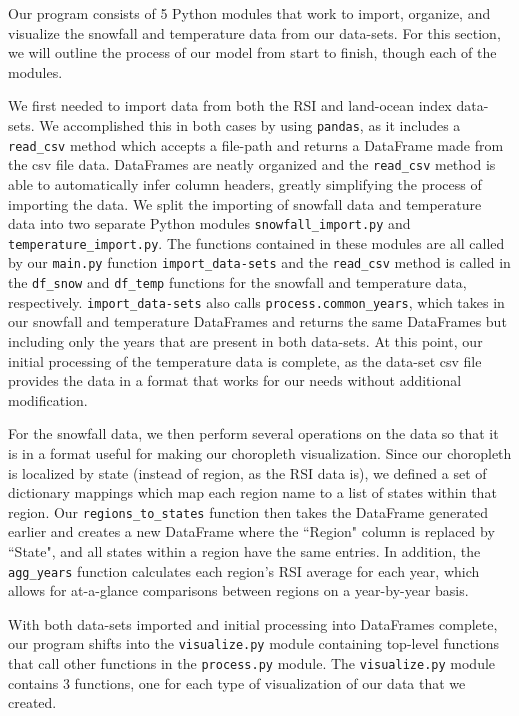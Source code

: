 \documentclass[fontsize=11pt]{article}
\begin{document}
Our program consists of 5 Python modules that work to import, organize, and visualize the snowfall and temperature data from our data-sets. For this section, we will outline the process of our model from start to finish, though each of the modules.

We first needed to import data from both the RSI and land-ocean index data-sets. We accomplished this in both cases by using \texttt{pandas}, as it includes a \texttt{read\_csv} method which accepts a file-path and returns a DataFrame made from the csv file data. DataFrames are neatly organized and the \texttt{read\_csv} method is able to automatically infer column headers, greatly simplifying the process of importing the data. We split the importing of snowfall data and temperature data into two separate Python modules \texttt{snowfall\_import.py} and \texttt{temperature\_import.py}. The functions contained in these modules are all called by our \texttt{main.py} function \texttt{import\_data-sets} and the \texttt{read\_csv} method is called in the \texttt{df\_snow} and \texttt{df\_temp} functions for the snowfall and temperature data, respectively. \texttt{import\_data-sets} also calls \texttt{process.common\_years}, which takes in our snowfall and temperature DataFrames and returns the same DataFrames but including only the years that are present in both data-sets. At this point, our initial processing of the temperature data is complete, as the data-set csv file provides the data in a format that works for our needs without additional modification.

For the snowfall data, we then perform several operations on the data so that it is in a format useful for making our choropleth visualization. Since our choropleth is localized by state (instead of region, as the RSI data is), we defined a set of dictionary mappings which map each region name to a list of states within that region. Our \texttt{regions\_to\_states} function then takes the DataFrame generated earlier and creates a new DataFrame where the ``Region" column is replaced by ``State", and all states within a region have the same entries. In addition, the \texttt{agg\_years} function calculates each region's RSI average for each year, which allows for at-a-glance comparisons between regions on a year-by-year basis.

With both data-sets imported and initial processing into DataFrames complete, our program shifts into the \texttt{visualize.py} module containing top-level functions that call other functions in the \texttt{process.py} module. The \texttt{visualize.py} module contains 3 functions, one for each type of visualization of our data that we created.
\end{document}
